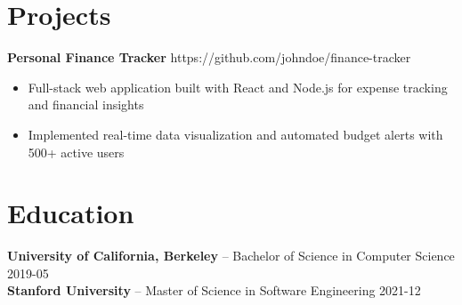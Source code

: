 \documentclass[11pt]{article}
\begin{document}
\vspace{-18.5pt}



\section*{Projects}
\textbf{ Personal Finance Tracker} \hfill https://github.com/johndoe/finance-tracker \\
\vspace{-9pt}
\begin{itemize}
\item Full-stack web application built with React and Node.js for expense tracking and financial insights
\item Implemented real-time data visualization and automated budget alerts with 500+ active users
\end{itemize}


\vspace{-18.5pt}



\section*{Education}
\textbf{ University of California, Berkeley} -- Bachelor of Science in Computer Science \hfill 2019-05 \\
\textbf{ Stanford University} -- Master of Science in Software Engineering \hfill 2021-12
\end{document}
